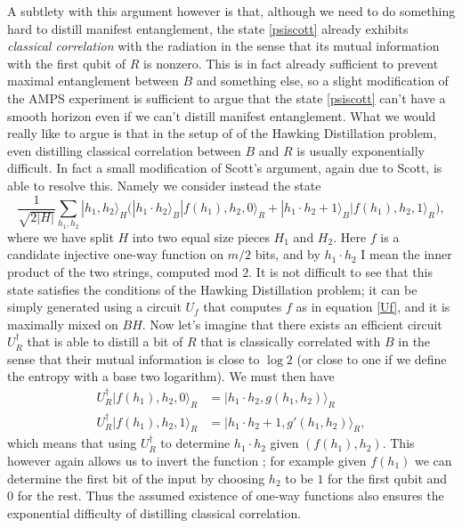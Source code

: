 \documentclass[12pt]{article}
\newcommand{\be}{\begin{equation}}
\newcommand{\ee}{\end{equation}}
\newcommand{\ran}{\rangle}
\begin{document}
A subtlety with this argument however is that, although we need to do something hard to distill manifest entanglement, the state \eqref{psiscott} already exhibits \textit{classical correlation} with the radiation in the sense that its mutual information with the first qubit of $R$ is nonzero.  This is in fact already sufficient to prevent maximal entanglement between $B$ and something else, so a slight modification of the AMPS experiment is sufficient to argue that the state \eqref{psiscott} can't have a smooth horizon even if we can't distill manifest entanglement.  What we would really like to argue is that in the setup of of the Hawking Distillation problem, even distilling classical correlation between $B$ and $R$ is usually exponentially difficult.  In fact a small modification of Scott's argument, again due to Scott, is able to resolve this.  Namely we consider instead the state
\be\label{psiscott2}
\frac{1}{\sqrt{2|H|}}\sum_{h_1,h_2}|h_1,h_2\ran_H \Big( |h_1\cdot h_2 \ran_B |f(h_1),h_2,0\ran_R+|h_1\cdot h_2+1\ran_B |f(h_1),h_2,1\ran_R\Big),
\ee
where we have split $H$ into two equal size pieces $H_1$ and $H_2$.  Here $f$ is a candidate injective one-way function on $m/2$ bits, and by $h_1 \cdot h_2$ I mean the inner product of the two strings, computed mod $2$.  It is not difficult to see that this state satisfies the conditions of the Hawking Distillation problem; it can be simply generated using a circuit $U_f$ that computes $f$ as in equation \eqref{Uf}, and it is maximally mixed on $BH$.  Now let's imagine that there exists an efficient circuit $U_R^\dagger$ that is able to distill a bit of $R$ that is classically correlated with $B$ in the sense that their mutual information is close to $\log 2$ (or close to one if we define the entropy with a base two logarithm).  We must then have
\begin{align}\nonumber
U_R^\dagger|f(h_1),h_2,0\ran_R&=|h_1\cdot h_2,g(h_1,h_2)\ran_R\\
U_R^\dagger|f(h_1),h_2,1\ran_R&=|h_1\cdot h_2+1,g'(h_1,h_2)\ran_R,
\end{align}
which means that using $U_R^\dagger$ to determine $h_1\cdot h_2$ given $(f(h_1),h_2)$.  This however again allows us to invert the function \cite{goldreich1989hard}; for example given $f(h_1)$ we can determine the first bit of the input by choosing $h_2$ to be $1$ for the first qubit and $0$ for the rest.   Thus the assumed existence of one-way functions also ensures the exponential difficulty of distilling classical correlation.  
\end{document}
